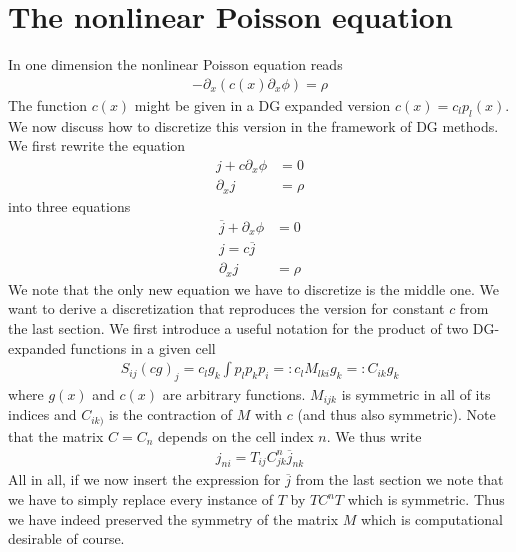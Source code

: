 \documentclass[a4paper,12pt]{scrartcl}
\begin{document}
\section{ The nonlinear Poisson equation}
In one dimension the nonlinear Poisson equation reads
\begin{align}
    -\partial_x ( c(x) \partial_x \phi) = \rho
    \label{}
\end{align}
The function $c(x)$ might be given in a DG expanded version $c(x) = c_lp_l(x)$.
We now discuss how to discretize this version in the framework of DG methods. 
We first rewrite the equation 
\begin{subequations}
    \begin{align}
      j + c\partial_x \phi &= 0\\
      \partial_x j &= \rho
        \label{}
    \end{align}
    \label{}
\end{subequations}
into three equations
\begin{subequations}
    \begin{align}
      \overline j + \partial_x \phi &= 0\\
      j = c\overline j\\
      \partial_x j &= \rho
        \label{}
    \end{align}
    \label{}
\end{subequations}
We note that the only new equation we have to discretize is the middle one.
We want to derive a discretization that 
reproduces the version for constant $c$ from the last section. 
We first introduce a useful notation for the product of two DG-expanded functions
in a given cell
\begin{align}
    S_{ij}(cg)_j = c_l g_k \int p_l p_k p_i =: c_l M_{lki} g_k =: C_{ik}g_k 
    \label{}
\end{align}
where $g(x)$ and $c(x)$ are arbitrary functions.
$M_{ijk}$ is symmetric in all of its indices and $C_{ik)}$ is the 
contraction of $M$ with $c$ (and thus also symmetric). 
Note that the matrix $C = C_n$ 
depends on the cell index $n$. We thus write
\begin{align}
    j_{ni} = T_{ij}C^n_{jk}\overline j_{nk}
    \label{}
\end{align}
All in all, if we now insert the expression for $\overline j$ from the last section
we note that we have to simply replace every instance of $T$ by $TC^nT$ 
which is symmetric. Thus we have indeed preserved the symmetry of the matrix $M$ 
which is computational desirable of course. 
\end{document}
